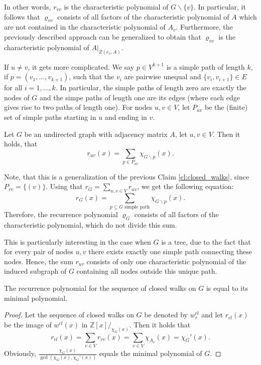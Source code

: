 \documentclass[a4paper,12pt]{article}
\begin{document}
In other words, $r_{vv}$ is the characteristic polynomial of $G\backslash\{v\}$. In particular, it follows that $\varrho_{vv}$ consists of all factors of the characteristic polynomial of $A$ which are not contained in the characteristic polynomial of $A_v$. Furthermore, the previously described approach can be generalized to obtain that $\varrho_{vv}$ is the characteristic polynomial of $A|_{Z(e_v,A)}$.

If $u\neq v$, it gets more complicated. We say $p \in V^{k+1}$ is a simple path of length $k$, if $p = (v_1, \ldots, v_{k+1})$, such that the $v_i$ are pairwise unequal and $\{v_i,v_{i+1}\} \in E$ for all $i=1, \ldots, k$. In particular, the simple paths of length zero are exactly the nodes of $G$ and the simpe paths of length one are its edges (where each edge gives rise to two paths of length one). For nodes $u,v\in V$, let $P_{uv}$ be the (finite) set of simple paths starting in $u$ and ending in $v$.

\begin{claim}\label{cl:local_walks}
Let $G$ be an undirected graph with adjacency matrix $A$, let $u,v\in V$. Then it holds, that
$$
r_{uv}(x) = \sum_{p\in P_{uv}} \chi_{G\backslash p}(x).
$$
\end{claim}

Note, that this is a generalization of the previous Claim \ref{cl:closed_walks}, since $P_{vv} = \{(v)\}$. Using that $r_G = \sum_{u,v\in V}r_{uv}$, we get the following equation:
$$
r_G(x) = \sum_{p\subseteq G \text{ simple path}}\chi_{G\backslash p}(x).
$$
Therefore, the recurrence polynomial $\varrho_G$ consists of all factors of the characteristic polynomial, which do not divide this sum.

\begin{remark}
This is particularly interesting in the case when $G$ is a tree, due to the fact that for every pair of nodes $u, v$ there exists exactly one simple path connecting these nodes. Hence, the sum $r_{uv}$ consists of only one characteristic polynomial of the induced subgraph of $G$ containing all nodes outside this unique path.
\end{remark}

\begin{cor}
The recurrence polynomial for the sequence of closed walks on $G$ is equal to its minimal polynomial.
\end{cor}

\begin{proof}
Let the sequence of closed walks on $G$ be denoted by $w^{cl}_r$ and let $r_{cl}(x)$ be the image of $w^{cl}(x)$ in $\mathbb{Z}[x]/_{\chi_G(x)}$. Then it holds that
$$
r_{cl}(x) = \sum_{v\in V} r_{vv}(x) = \sum_{v\in V}\chi_{A_v}(x) = \chi_G'(x).
$$
Obviously, $\frac{\chi_G(x)}{\gcd\left(\chi_G(x), \chi_G'(x)\right)}$ equals the minimal polynomial of $G$.
\end{proof}
\end{document}
